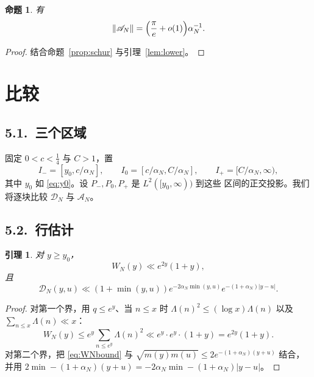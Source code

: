 \documentclass[12pt,a4paper]{amsart}
\numberwithin{equation}{section}
\theoremstyle{plain}
\newtheorem{proposition}[theorem]{命题}
\newtheorem{lemma}[theorem]{引理}
\theoremstyle{definition}
\begin{document}
\begin{proposition}\label{prop:modelnorm}
有
\begin{equation}\label{eq:modelnorm}
 \|\mathscr A_N\|=\Bigl(\frac{\pi}{e}+o(1)\Bigr)\alpha_N^{-1}.
\end{equation}
\end{proposition}

\begin{proof}
结合命题~\ref{prop:schur} 与引理~\ref{lem:lower}。
\end{proof}

\section{比较}\label{sec:compare}

\subsection*{5.1.\ 三个区域}

固定 $0<c<\frac14$ 与 $C>1$，置
\begin{equation}\label{eq:regions}
 I_-=[y_0,c/\alpha_N],\qquad I_0=[c/\alpha_N,C/\alpha_N],\qquad
 I_+=[C/\alpha_N,\infty),
\end{equation}
其中 $y_0$ 如 \eqref{eq:y0}。设 $P_-,P_0,P_+$ 是 $L^2([y_0,\infty))$ 到这些
区间的正交投影。我们将逐块比较 $\mathcal D_N$ 与 $\mathscr A_N$。

\subsection*{5.2.\ 行估计}

\begin{lemma}\label{lem:row}
对 $y\ge y_0$，
\begin{equation}\label{eq:WNbound}
 W_N(y)\ll e^{2y}(1+y),
\end{equation}
且
\begin{equation}\label{eq:Dbound}
 \mathscr D_N(y,u)\ll(1+\min(y,u))e^{-2\alpha_N\min(y,u)}
 e^{-(1+\alpha_N)|y-u|}.
\end{equation}
\end{lemma}

\begin{proof}
对第一个界，用 $q\le e^y$、当 $n\le x$ 时 $\Lambda(n)^2\le(\log x)\Lambda(n)$
以及 $\sum_{n\le x}\Lambda(n)\ll x$：
\[
 W_N(y)\le e^y\sum_{n\le e^y}\Lambda(n)^2
 \ll e^y\cdot e^y\cdot(1+y)=e^{2y}(1+y).
\]
对第二个界，把 \eqref{eq:WNbound} 与
$\sqrt{m(y)m(u)}\le2e^{-(1+\alpha_N)(y+u)}$ 结合，并用
$2\min-(1+\alpha_N)(y+u)=-2\alpha_N\min-(1+\alpha_N)|y-u|$。
\end{proof}
\end{document}
